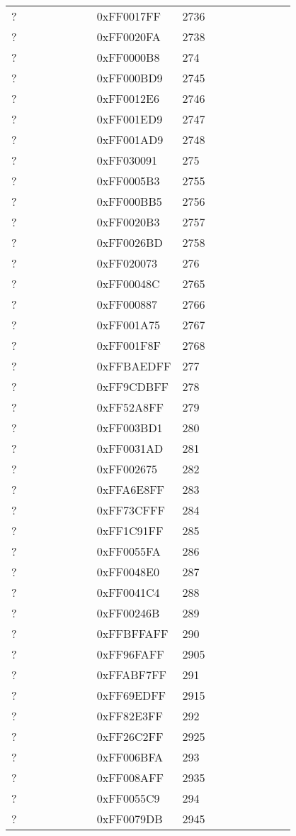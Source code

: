 \begin{longtable}{p{0.3\linewidth} p{0.3\linewidth} p{0.4\linewidth}}
? &  0xFF0017FF &  2736\\
? &  0xFF0020FA &  2738\\
? &  0xFF0000B8 &  274\\
? &  0xFF000BD9 &  2745\\
? &  0xFF0012E6 &  2746\\
? &  0xFF001ED9 &  2747\\
? &  0xFF001AD9 &  2748\\
? &  0xFF030091 &  275\\
? &  0xFF0005B3 &  2755\\
? &  0xFF000BB5 &  2756\\
? &  0xFF0020B3 &  2757\\
? &  0xFF0026BD &  2758\\
? &  0xFF020073 &  276\\
? &  0xFF00048C &  2765\\
? &  0xFF000887 &  2766\\
? &  0xFF001A75 &  2767\\
? &  0xFF001F8F &  2768\\
? &  0xFFBAEDFF &  277\\
? &  0xFF9CDBFF &  278\\
? &  0xFF52A8FF &  279\\
? &  0xFF003BD1 &  280\\
? &  0xFF0031AD &  281\\
? &  0xFF002675 &  282\\
? &  0xFFA6E8FF &  283\\
? &  0xFF73CFFF &  284\\
? &  0xFF1C91FF &  285\\
? &  0xFF0055FA &  286\\
? &  0xFF0048E0 &  287\\
? &  0xFF0041C4 &  288\\
? &  0xFF00246B &  289\\
? &  0xFFBFFAFF &  290\\
? &  0xFF96FAFF &  2905\\
? &  0xFFABF7FF &  291\\
? &  0xFF69EDFF &  2915\\
? &  0xFF82E3FF &  292\\
? &  0xFF26C2FF &  2925\\
? &  0xFF006BFA &  293\\
? &  0xFF008AFF &  2935\\
? &  0xFF0055C9 &  294\\
? &  0xFF0079DB &  2945\\

\end{longtable}
